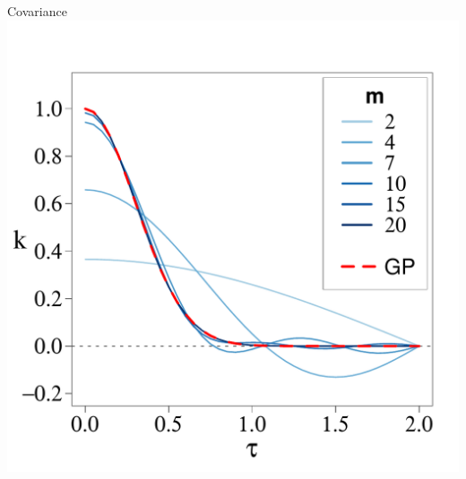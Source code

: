 \documentclass[8pt]{beamer} %
\begin{document}
\begin{frame}
\begin{enumerate}
\begin{itemize}
\begin{adjustwidth}{-4.7em}{-3em}
\centering
{\scriptsize \hspace{5mm} Covariance \hspace{30mm}  \hspace{27mm} }\\[-4mm]
%
\includegraphics[scale=0.23, trim = 0mm 0mm 0mm 0mm, clip]{ch5_fig1_Cov_J.pdf}

\end{adjustwidth}
\end{itemize}
\end{enumerate}
\end{frame}
\end{document}
